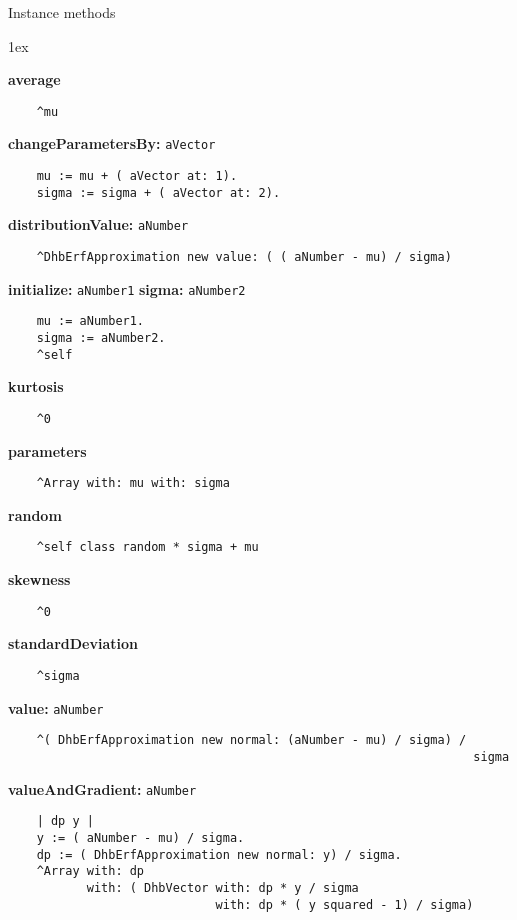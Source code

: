 Instance methods
{\parskip 1ex\par\noindent}
{\bf average}
\begin{verbatim}
    ^mu

\end{verbatim}
{\bf changeParametersBy:} {\tt aVector}
\begin{verbatim}
    mu := mu + ( aVector at: 1).
    sigma := sigma + ( aVector at: 2).

\end{verbatim}
{\bf distributionValue:} {\tt aNumber}
\begin{verbatim}
    ^DhbErfApproximation new value: ( ( aNumber - mu) / sigma)

\end{verbatim}
{\bf initialize:} {\tt aNumber1} {\bf sigma:} {\tt aNumber2}
\begin{verbatim}
    mu := aNumber1.
    sigma := aNumber2.
    ^self

\end{verbatim}
{\bf kurtosis}
\begin{verbatim}
    ^0

\end{verbatim}
{\bf parameters}
\begin{verbatim}
    ^Array with: mu with: sigma

\end{verbatim}
{\bf random}
\begin{verbatim}
    ^self class random * sigma + mu

\end{verbatim}
{\bf skewness}
\begin{verbatim}
    ^0

\end{verbatim}
{\bf standardDeviation}
\begin{verbatim}
    ^sigma

\end{verbatim}
{\bf value:} {\tt aNumber}
\begin{verbatim}
    ^( DhbErfApproximation new normal: (aNumber - mu) / sigma) / 
                                                                 sigma

\end{verbatim}
{\bf valueAndGradient:} {\tt aNumber}
\begin{verbatim}
    | dp y |
    y := ( aNumber - mu) / sigma.
    dp := ( DhbErfApproximation new normal: y) / sigma.
    ^Array with: dp
           with: ( DhbVector with: dp * y / sigma
                             with: dp * ( y squared - 1) / sigma)

\end{verbatim}

